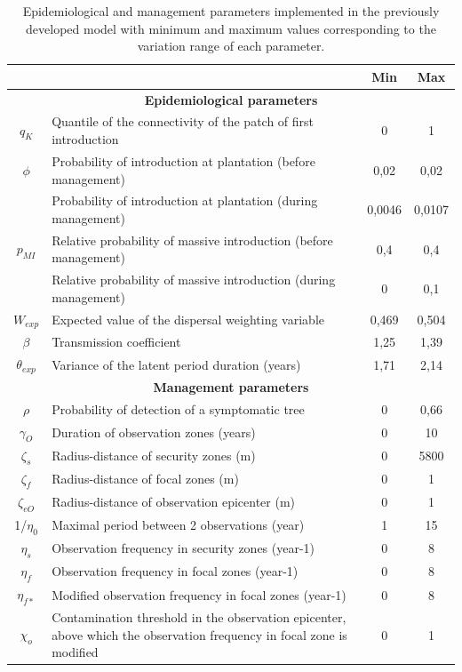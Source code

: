 \begin{table}[htbp]
	\centering
	\caption{Epidemiological and management parameters implemented in the previously developed model  with minimum and maximum values corresponding to the variation range of each parameter.}
	\begin{tabular}{|c|p{33.785em}|c|c|}
		\cmidrule{3-4}    \multicolumn{1}{c}{} & \multicolumn{1}{c|}{} & \textbf{Min} & \textbf{Max} \\
		\midrule
		\multicolumn{4}{|c|}{\textbf{Epidemiological parameters}} \\
		\midrule
		$q_{K}$    & Quantile of the connectivity of the patch of first introduction & 0     & 1 \\
		\midrule
		$\phi$ & Probability of introduction at plantation (before management) & 0,02  & 0,02 \\
		\cmidrule{2-4}          & Probability of introduction at plantation (during management) & 0,0046 & 0,0107 \\
		\midrule
		$p_{MI}$ & Relative probability of massive introduction (before management) & 0,4   & 0,4 \\
		\cmidrule{2-4}          & Relative probability of massive introduction  (during management) & 0     & 0,1 \\
		\midrule
		$W_{exp}$  & Expected value of the dispersal weighting variable & 0,469 & 0,504 \\
		\midrule
		$\beta$     & Transmission coefficient & 1,25  & 1,39 \\
		\midrule
		$\theta_{exp}$  & Variance of the latent period duration (years) & 1,71  & 2,14 \\
		\midrule
		\multicolumn{4}{|c|}{\textbf{Management parameters}} \\
		\midrule
		$\rho$    & Probability of detection of a symptomatic tree & 0     & 0,66 \\
		\midrule
		$\gamma_{O}$    & Duration of observation zones (years) & 0     & 10 \\
		\midrule
		$\zeta_{s}$   & Radius-distance of security zones (m) & 0     & 5800 \\
		\midrule
		$\zeta_{f}$  & Radius-distance of focal zones (m) & 0     & 1 \\
		\midrule
		$\zeta_{eO}$ & Radius-distance of observation epicenter (m) & 0     & 1 \\
		\midrule
		1/$\eta_{0}$  & Maximal period between 2 observations (year) & 1     & 15 \\
		\midrule
		$\eta_{s}$    & Observation frequency in security zones (year-1) & 0     & 8 \\
		\midrule
		$\eta_{f}$    & Observation frequency in focal zones (year-1) & 0     & 8 \\
		\midrule
		$\eta_{f*}$   & Modified observation frequency in focal zones (year-1) & 0     & 8 \\
		\midrule
		$\chi_{o}$    & Contamination threshold in the observation epicenter, above which the observation frequency in focal zone is modified & 0     & 1 \\
		\bottomrule
	\end{tabular}%
	\label{tab:tableparameters}%
\end{table}%

